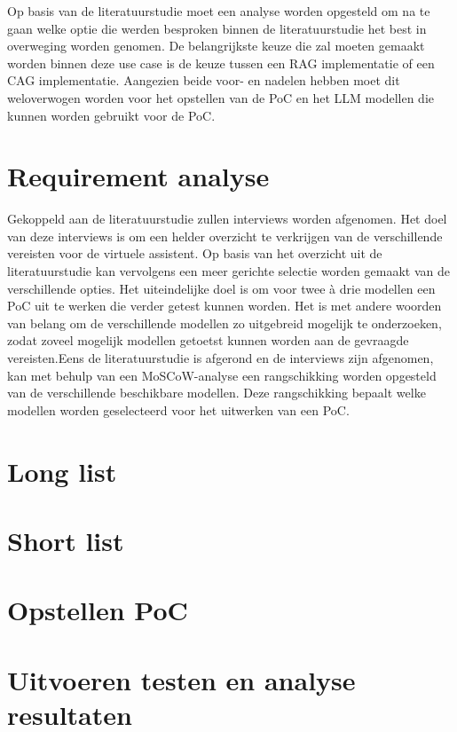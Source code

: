 Op basis van de literatuurstudie moet een analyse worden opgesteld om na te gaan welke optie die werden besproken binnen de literatuurstudie het best in overweging worden genomen. De belangrijkste keuze die zal moeten gemaakt worden binnen deze use case is de keuze tussen een RAG implementatie of een CAG implementatie. Aangezien beide voor- en nadelen hebben moet dit weloverwogen worden voor het opstellen van de PoC en het LLM modellen die kunnen worden gebruikt voor de PoC.


\section{Requirement analyse}


Gekoppeld aan de literatuurstudie zullen interviews worden afgenomen. Het doel van deze interviews is om een helder overzicht te verkrijgen van de verschillende vereisten voor de virtuele assistent. Op basis van het overzicht uit de literatuurstudie kan vervolgens een meer gerichte selectie worden gemaakt van de verschillende opties. Het uiteindelijke doel is om voor twee à drie modellen een PoC uit te werken die verder getest kunnen worden. Het is met andere woorden van belang om de verschillende modellen zo uitgebreid mogelijk te onderzoeken, zodat zoveel mogelijk modellen getoetst kunnen worden aan de gevraagde vereisten.Eens de literatuurstudie is afgerond en de interviews zijn afgenomen, kan met behulp van een MoSCoW-analyse een rangschikking worden opgesteld van de verschillende beschikbare modellen. Deze rangschikking bepaalt welke modellen worden geselecteerd voor het uitwerken van een PoC.

\section{Long list}

\section{Short list}

\section{Opstellen PoC}

\section{Uitvoeren testen en analyse resultaten}

